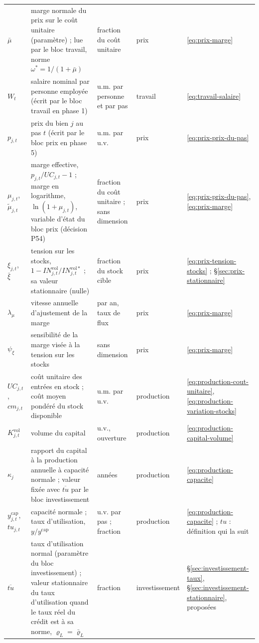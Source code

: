 \documentclass[11pt,a4paper]{article}
\begin{document}
\begin{center}
\begin{longtable}{>{\raggedright\arraybackslash}p{1.6cm}>{\raggedright\arraybackslash}p{5.6cm}>{\raggedright\arraybackslash}p{2.0cm}>{\raggedright\arraybackslash}p{2.2cm}>{\raggedright\arraybackslash}p{2.8cm}}
$\bar\mu$ & marge normale du prix sur le coût unitaire (paramètre) ; lue par le bloc travail, norme $\omega^{\ast} = 1/(1 + \bar\mu)$ & fraction du coût unitaire & prix & \eqref{eq:prix-marge}\\
$W_t$ & salaire nominal par personne employée (écrit par le bloc travail en phase 1) & u.m. par personne et par pas & travail & \eqref{eq:travail-salaire}\\
$p_{j,t}$ & prix du bien $j$ au pas $t$ (écrit par le bloc prix en phase 5) & u.m. par u.v. & prix & \eqref{eq:prix-prix-du-pas}\\
$\mu_{j,t}$, $\tilde\mu_{j,t}$ & marge effective, $p_{j,t}/\mathit{UC}_{j,t} - 1$ ; marge en logarithme, $\ln(1 + \mu_{j,t})$, variable d'état du bloc prix (décision P54) & fraction du coût unitaire ; sans dimension & prix & \eqref{eq:prix-prix-du-pas}, \eqref{eq:prix-marge}\\
$\xi_{j,t}$, $\bar\xi$ & tension sur les stocks, $1 - \mathit{IN}^{\mathrm{vol}}_{j,t}/\mathit{IN}^{\mathrm{vol}\ast}_{j,t}$ ; sa valeur stationnaire (nulle) & fraction du stock cible & prix & \eqref{eq:prix-tension-stocks} ; \S\ref{sec:prix-stationnaire}\\
$\lambda_\mu$ & vitesse annuelle d'ajustement de la marge & par an, taux de flux & prix & \eqref{eq:prix-marge}\\
$\psi_\xi$ & sensibilité de la marge visée à la tension sur les stocks & sans dimension & prix & \eqref{eq:prix-marge}\\
$\mathit{UC}_{j,t}$, $\mathit{cm}_{j,t}$ & coût unitaire des entrées en stock ; coût moyen pondéré du stock disponible & u.m. par u.v. & production & \eqref{eq:production-cout-unitaire}, \eqref{eq:production-variation-stocks}\\
$K^{\mathrm{vol}}_{j,t}$ & volume du capital & u.v., ouverture & production & \eqref{eq:production-capital-volume}\\
$\kappa_j$ & rapport du capital à la production annuelle à capacité normale ; valeur fixée avec $\overline{\mathit{tu}}$ par le bloc investissement & années & production & \eqref{eq:production-capacite}\\
$y^{\mathrm{cap}}_{j,t}$, $\mathit{tu}_{j,t}$ & capacité normale ; taux d'utilisation, $y/y^{\mathrm{cap}}$ & u.v. par pas ; fraction & production & \eqref{eq:production-capacite} ; $\mathit{tu}$ : définition qui la suit\\
$\overline{\mathit{tu}}$ & taux d'utilisation normal (paramètre du bloc investissement) ; valeur stationnaire du taux d'utilisation quand le taux réel du crédit est à sa norme, $\varrho_L = \bar\varrho_L$ & fraction & investissement & \S\ref{sec:investissement-taux}, \S\ref{sec:investissement-stationnaire}, proposées\\

\end{longtable}
\end{center}
\end{document}

